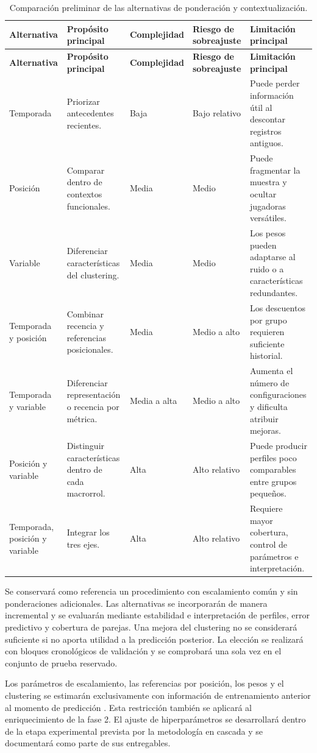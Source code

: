 \begingroup
\small
\setlength{\tabcolsep}{3pt}
\renewcommand{\arraystretch}{1.15}
\begin{longtable}{@{}p{2.4cm}p{2.85cm}p{1.95cm}p{2.05cm}p{3.15cm}@{}}
\caption{Comparación preliminar de las alternativas de ponderación y contextualización.}\label{tab:comparacion-ponderaciones-fase1}\\
\toprule
\textbf{Alternativa} & \textbf{Propósito principal} & \textbf{Comple\-jidad} & \textbf{Riesgo de sobreajuste} & \textbf{Limitación principal}\\
\midrule
\endfirsthead
\toprule
\textbf{Alternativa} & \textbf{Propósito principal} & \textbf{Comple\-jidad} & \textbf{Riesgo de sobreajuste} & \textbf{Limitación principal}\\
\midrule
\endhead
Temporada & Priorizar antecedentes recientes. & Baja & Bajo relativo & Puede perder información útil al descontar registros antiguos.\\
\midrule
Posición & Comparar dentro de contextos funcionales. & Media & Medio & Puede fragmentar la muestra y ocultar jugadoras versátiles.\\
\midrule
Variable & Diferenciar características del clustering. & Media & Medio & Los pesos pueden adaptarse al ruido o a características redundantes.\\
\midrule
Temporada y posición & Combinar recencia y referencias posicionales. & Media & Medio a alto & Los descuentos por grupo requieren suficiente historial.\\
\midrule
Temporada y variable & Diferenciar representación o recencia por métrica. & Media a alta & Medio a alto & Aumenta el número de configuraciones y dificulta atribuir mejoras.\\
\midrule
Posición y variable & Distinguir características dentro de cada macrorrol. & Alta & Alto relativo & Puede producir perfiles poco comparables entre grupos pequeños.\\
\midrule
Temporada, posición y variable & Integrar los tres ejes. & Alta & Alto relativo & Requiere mayor cobertura, control de parámetros e interpretación.\\
\bottomrule
\end{longtable}
\endgroup

Se conservará como referencia un procedimiento con escalamiento común y sin ponderaciones adicionales. Las alternativas se incorporarán de manera incremental y se evaluarán mediante estabilidad e interpretación de perfiles, error predictivo y cobertura de parejas. Una mejora del clustering no se considerará suficiente si no aporta utilidad a la predicción posterior. La elección se realizará con bloques cronológicos de validación y se comprobará una sola vez en el conjunto de prueba reservado.

Los parámetros de escalamiento, las referencias por posición, los pesos y el clustering se estimarán exclusivamente con información de entrenamiento anterior al momento de predicción \cite{sklearnCommonPitfallsPonderacion}. Esta restricción también se aplicará al enriquecimiento de la fase 2. El ajuste de hiperparámetros se desarrollará dentro de la etapa experimental prevista por la metodología en cascada y se documentará como parte de sus entregables.

\setcounter{secnumdepth}{\profundidadAntesPonderacion}
